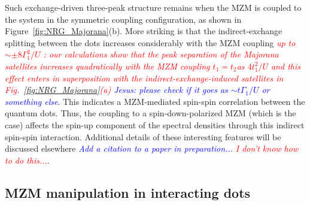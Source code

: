 \documentclass[showpacs,aps,prb,reprint,superscriptaddress]{revtex4-2}
\newcommand{\LUIS}[1]{\textcolor{blue}{\fbox{Luis} {\sl#1}}}
\newcommand{\Jesus}[1]{\textcolor{red}{\fbox{Jesus} {\sl#1}}}
\newcommand{\change}[1]{\textcolor{red}{\sl#1}}
\begin{document}
Such exchange-driven three-peak structure remains when the MZM is coupled to the system in the symmetric coupling configuration, as shown in Figure\ \ref{fig:NRG_Majorana}(b). More striking is that the indirect-exchange splitting between the dots increases considerably with the MZM coupling \change{up to $\sim \pm 8\Gamma_1^2/U$ : our calculations show that the peak separation of the Majorana satellites increases quadratically with the MZM coupling $t_1\!=\!t_2$as $4t_1^2/U$  and this effect enters in superposition with the indirect-exchange-induced satellites in Fig.\ \ref{fig:NRG_Majorana}(a)  \LUIS{Jesus: please check if it goes as $\sim t \Gamma_1/U$ or something else}}. This indicates a MZM-mediated spin-spin correlation between the quantum dots. Thus, the coupling to a spin-down-polarized MZM (which is the case) affects the spin-up component of the spectral densities through this indirect spin-spin interaction. Additional details of these interesting features will be discussed elsewhere \LUIS{Add a citation to a paper in preparation...}\Jesus{I don't know how to do this...}.




    \subsection{MZM manipulation in interacting dots \label{subsec:Interacting}}
\end{document}

